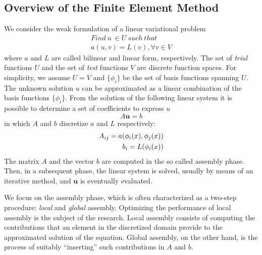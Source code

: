 \subsection{Overview of the Finite Element Method}
We consider the weak formulation of a linear variational problem
\begin{equation}
\begin{split}
Find\ u\ \in U\ such\ that \\
a(u, v) = L(v), \forall v \in V
\end{split}
\end{equation}
where $a$ and $L$ are called bilinear and linear form, respectively. The set of \textit{trial} functions $U$ and the set of \textit{test} functions $V$ are discrete function spaces. For simplicity, we assume $U = V$ and $\lbrace \phi_i \rbrace$ be the set of basis functions spanning $U$. The unknown solution $u$ can be approximated as a linear combination of the basis functions $\lbrace \phi_i \rbrace$. From the solution of the following linear system it is possible to determine a set of coefficients to express $u$
\begin{equation}
A\textbf{u} = b
\end{equation}
in which $A$ and $b$ discretize $a$ and $L$ respectively:
\begin{equation}
\centering
\begin{split}
A_{ij} = a(\phi_i(x), \phi_j(x)) \\
b_i = L(\phi_i(x))
\end{split}
\end{equation}
The matrix $A$ and the vector $b$ are computed in the so called assembly phase. Then, in a subsequent phase, the linear system is solved, usually by means of an iterative method, and $\textbf{u}$ is eventually evaluated. 

We focus on the assembly phase, which is often characterized as a two-step procedure: \textit{local} and \textit{global} assembly. Optimizing the performance of local assembly is the subject of the research. Local assembly consists of computing the contributions that an element in the discretized domain provide to the approximated solution of the equation. Global assembly, on the other hand, is the process of suitably ``inserting'' such contributions in $A$ and $b$. 

